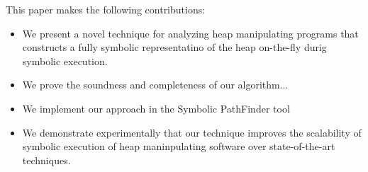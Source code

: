 This paper makes the following contributions:

\begin{itemize}
\item{We present a novel technique for analyzing heap manipulating
programs that constructs a fully symbolic representatino of
the heap on-the-fly durig symbolic execution.}
\item{We prove the soundness and completeness of our algorithm...}
\item{We implement our approach in the Symbolic PathFinder tool}
\item{We demonstrate experimentally that our technique improves
the scalability of symbolic execution of heap maninpulating software
over state-of-the-art techniques.}
  
 \end{itemize}

\begin{comment}
\newcommand{\Indstate}[1][1]{\State\hspace{#1\algorithmicindent}}

\begin{figure}
\begin{center}
\begin{algorithmic}[1]
\Procedure{load}{$r,f$}
\If{$r$ is initialized and $f$ is uninitialized}
\If{ $f$ has a reference type}
\State nondeterministically assign to $f$:
\State  \ \ null  %
\State \ \ non-null
\EndIf
\If{$f$ has a primitive type}
\State assign $f$ a new symbol
\EndIf
\EndIf
\If{$r$ is uninitialized}
\State nondeterministically assign to $f$:
\State  \ \ a new symbolic location  %
\State \ \ an existing symbolic location
\EndIf
\State\Return $r.f$
\EndProcedure
\end{algorithmic}
\end{center}
\caption{Lazier\# Initialization}
\end{figure}

Lazy initialization is a symbolic execution technique where memory structures are created on-demand, as they are required.
\end{comment}



